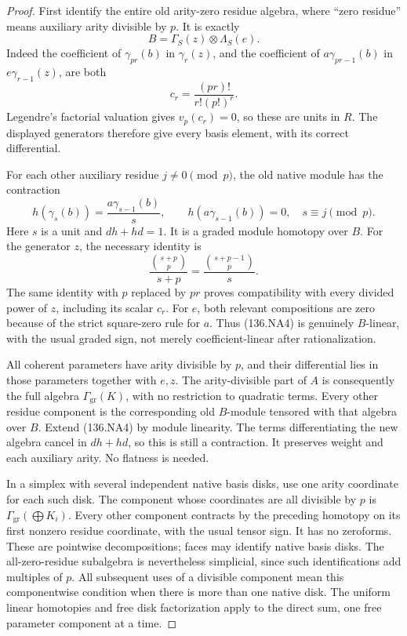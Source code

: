 \begin{proof}
First identify the entire old arity-zero residue algebra,
where ``zero residue'' means auxiliary arity divisible by \(p\).
It is exactly
\[
              B=\Gamma_S(z)\otimes\Lambda_S(e).
                                                               \tag{136.NA3}
\]
Indeed the coefficient of \(\gamma_{pr}(b)\) in
\(\gamma_r(z)\), and the coefficient of
\(a\gamma_{pr-1}(b)\) in \(e\gamma_{r-1}(z)\),
are both
\[
                      c_r=\frac{(pr)!}{r!(p!)^r}.
\]
Legendre's factorial valuation gives \(v_p(c_r)=0\), so
these are units in \(R\). The displayed generators therefore
give every basis element, with its correct differential.

For each other auxiliary residue \(j\ne0\pmod p\),
the old native module has the contraction
\[
 h(\gamma_s(b))=\frac{a\gamma_{s-1}(b)}{s},\qquad
 h(a\gamma_{s-1}(b))=0,
                          \quad s\equiv j\pmod p.
                                                               \tag{136.NA4}
\]
Here \(s\) is a unit and \(dh+hd=1\).
It is a graded module homotopy over \(B\).
For the generator \(z\), the necessary identity is
\[
 \frac{\binom{s+p}{p}}{s+p}
                 =\frac{\binom{s+p-1}{p}}{s}.
\]
The same identity with \(p\) replaced by \(pr\) proves
compatibility with every divided power of \(z\), including
its scalar \(c_r\). For \(e\), both relevant compositions
are zero because of the strict square-zero rule for \(a\).
Thus (136.NA4) is genuinely \(B\)-linear, with the usual
graded sign, not merely coefficient-linear after rationalization.

All coherent parameters have arity divisible by \(p\), and
their differential lies in those parameters together with
\(e,z\). The arity-divisible part of \(A\) is consequently
the full algebra \(\Gamma_{\mathrm{gr}}(K)\), with no
restriction to quadratic terms. Every other residue component
is the corresponding old \(B\)-module tensored with that
algebra over \(B\). Extend (136.NA4) by module linearity.
The terms differentiating the new algebra cancel in
\(dh+hd\), so this is still a contraction. It preserves
weight and each auxiliary arity. No flatness is needed.

In a simplex with several independent native basis disks,
use one arity coordinate for each such disk. The component
whose coordinates are all divisible by \(p\) is
\(\Gamma_{\mathrm{gr}}(\bigoplus K_i)\). Every other
component contracts by the preceding homotopy on its first
nonzero residue coordinate, with the usual tensor sign.
It has no zeroforms. These are pointwise decompositions;
faces may identify native basis disks. The all-zero-residue
subalgebra is nevertheless simplicial, since such identifications
add multiples of \(p\). All subsequent uses of a divisible
component mean this componentwise condition when there is
more than one native disk. The uniform linear homotopies and
free disk factorization apply to the direct sum, one free
parameter component at a time.


\end{proof}
